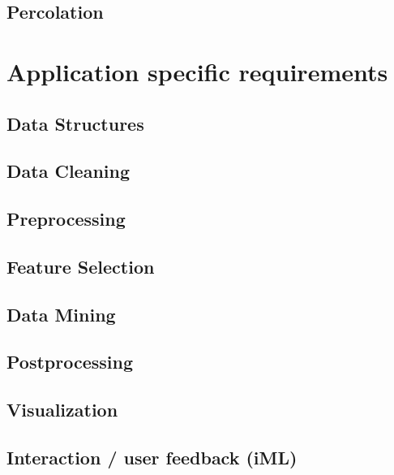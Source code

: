 	\subsection{Percolation}
	\label{ssect:app_percolation}




\section{Application specific requirements}
\label{section:app_requirements}

	\subsection{Data Structures}
	\label{ssect:data_gathering}
	
	\subsection{Data Cleaning}
	\label{ssect:data_cleaning}
	
	\subsection{Preprocessing}
	\label{ssect:preprocessing}
	
	\subsection{Feature Selection}
	\label{ssect:feature_selection}
	
	\subsection{Data Mining}
	\label{ssect:data_mining}
	
	\subsection{Postprocessing}
	\label{ssect:postprocessing}
	
	\subsection{Visualization}
	\label{ssect:visualization}
	
	\subsection{Interaction / user feedback (iML)}
	\label{ssect:interaction}
	